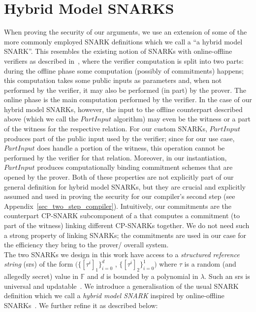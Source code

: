 \section{Hybrid Model SNARKS}
\label{sec:snarks_defs}
\noindent When proving the security of our arguments, we use an extension of some of the more commonly employed SNARK definitions which we call a ``a hybrid model SNARK''. This resembles the existing notion of SNARKs with online-offline verifiers as described in~\cite{HP_paper}, where the 
verifier computation is split into two parts: during the offline phase some computation (possibly of commitments) happens; this computation takes some public inputs as parameters and, when not performed by the verifier, it may also be performed (in part) by the prover. The online phase is the main computation performed by the verifier. In the case of our hybrid model SNARKs, however, the input to the offline counterpart described above (which we call the $\mathit{PartInput}$ algorithm) may even be the witness or 
a part of the witness for the respective relation. For our custom SNARKs, $\mathit{PartInput}$ produces part of the public input used by the verifier; 
since for our use case, $\mathit{PartInput}$ does handle a portion of the witness, this operation cannot be performed by the verifier for that relation. 
Moreover, in our instantiation, $\mathit{PartInput}$ produces computationally binding commitment schemes that are opened by the prover. Both of these properties 
are not explicitly part of our general definition for hybrid model SNARKs, but they are crucial and explicitly assumed and used 
in proving the security for our compiler's second step (see Appendix~\ref{sec_two_step_compiler}). Intuitively, our commitments 
are the counterpart CP-SNARK subcomponent of a that computes a commitment (to part of the witness) linking different CP-SNARKs together. 
We do not need such a strong property of linking SNARKs; the commitments are used in our case for the efficiency they bring to the prover/ overall system.\\

\noindent The two SNARKs we design in this work have access to a \emph{structured reference string} (srs) of the form 
$(\{[\tau^i]_1\}_{i=0}^{d}$ , $\{[\tau^i]_2\}_{i=0}^{1})$ where $\tau$ is a random (and allegedly secret) value in $\mathbb{F}$ and $d$ 
is bounded by a polynomial in $\lambda$. Such an srs is universal and updatable~\cite{updatable_universal_srs_2018}. 
We introduce a generalisation of the usual SNARK definition which we call a \emph{hybrid model SNARK} inspired by online-offline SNARKs~\cite{HP_paper}. We further refine it as described below:     

